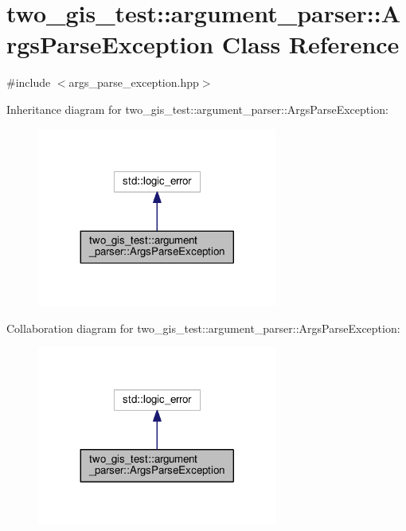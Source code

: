 \hypertarget{classtwo__gis__test_1_1argument__parser_1_1_args_parse_exception}{}\section{two\+\_\+gis\+\_\+test\+:\+:argument\+\_\+parser\+:\+:Args\+Parse\+Exception Class Reference}
\label{classtwo__gis__test_1_1argument__parser_1_1_args_parse_exception}


{\ttfamily \#include $<$args\+\_\+parse\+\_\+exception.\+hpp$>$}



Inheritance diagram for two\+\_\+gis\+\_\+test\+:\+:argument\+\_\+parser\+:\+:Args\+Parse\+Exception\+:\nopagebreak
\begin{figure}[H]
\begin{center}
\leavevmode
\includegraphics[width=224pt]{classtwo__gis__test_1_1argument__parser_1_1_args_parse_exception__inherit__graph}
\end{center}
\end{figure}


Collaboration diagram for two\+\_\+gis\+\_\+test\+:\+:argument\+\_\+parser\+:\+:Args\+Parse\+Exception\+:\nopagebreak
\begin{figure}[H]
\begin{center}
\leavevmode
\includegraphics[width=224pt]{classtwo__gis__test_1_1argument__parser_1_1_args_parse_exception__coll__graph}
\end{center}
\end{figure}

